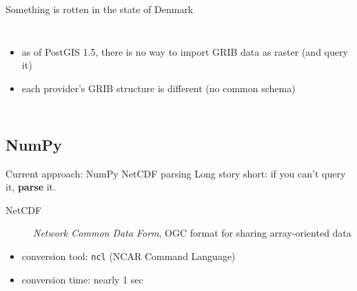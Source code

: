 \documentclass[xcolor=svgnames]{beamer}
\begin{document}
\begin{frame}{Something is rotten in the state of Denmark}
\begin{columns}[c]
{\begin{itemize}
                        \item as of PostGIS 1.5, there is no way to import GRIB data as raster (and query it)
                        \item each provider's GRIB structure is different (no common schema)\\\vspace{0.1\textheight}
                    \end{itemize}
                }
            \end{columns}
        \end{frame}


    \subsection{NumPy}

        \begin{frame}{Current approach: NumPy NetCDF parsing}
            Long story short: if you can't query it, \textbf{parse} it.
            \pause
            \begin{description}
                \item[NetCDF]\textit{Network Common Data Form}, OGC format for sharing array-oriented data
            \end{description}
            \pause
            \begin{center}
                \resizebox{0.9\textwidth}{!}{%
                    \begin{tikzpicture}
                        
                    \end{tikzpicture}
                }
            \end{center}
            \vfill
            \pause
            \begin{itemize}
                \item conversion tool: \texttt{ncl} (NCAR Command Language)
                \item conversion time: nearly 1 sec
            \end{itemize}
        \end{frame}
\end{document}
